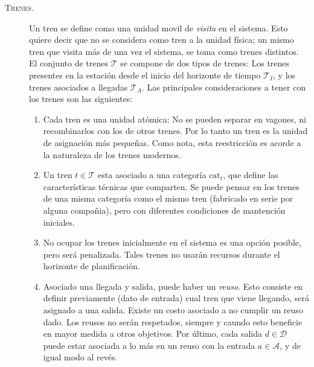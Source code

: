 \documentclass[letter, 10pt]{article}
\begin{document}
\begin{description}
	\item[\textsc{Trenes.}]
	Un tren se define como una unidad movil de \textit{visita} en el sistema. Esto quiere decir que no se considera como tren
	a la unidad física; un mismo tren que visita más de una vez el sistema, se toma como trenes distintos. El conjunto de trenes $\mathcal{T}$ se compone de dos tipos de trenes: Los trenes presentes en la estación desde el inicio del horizonte de tiempo $\mathcal{T}_I$,  y los trenes asociados a llegadas $\mathcal{T}_A$.
	Las principales consideraciones a tener con los trenes son las siguientes:
	\begin{enumerate}
		\item Cada tren es una unidad atómica; No se pueden separar en vagones, ni recombinarlos con los de otros trenes. Por lo tanto un tren es la unidad de asignación más pequeñas. Como nota, esta reestricción es acorde a la naturaleza de los trenes modernos.
		\item Un tren $t \in \mathcal{T}$ esta asociado a una categoría $\text{cat}_t$, que define las características técnicas que comparten. Se puede pensar en los trenes de una misma categoría como el mismo tren (fabricado en serie por alguna compañia), pero con diferentes condiciones de mantención iniciales. 
		\item No ocupar los trenes inicialmente en el sistema es una opción posible, pero será penalizada. Tales trenes no usarán recursos durante el horizonte de planificación.
		\item Asociado una llegada y salida, puede haber un \textit{reuso}. Esto consiste en definir previamente (dato de entrada) cual tren que viene llegando, será asignado a una salida. Existe un costo asociado a no cumplir un reuso dado. Los reusos no serán respetados, siempre y caundo esto beneficie en mayor medida a otros objetivos. Por último,
		cada salida $d \in \mathcal{D}$ puede estar asociada a lo más en un reuso con la entrada $a \in \mathcal{A}$, y de igual modo al revés.
	\end{enumerate}


\end{description}
\end{document}
